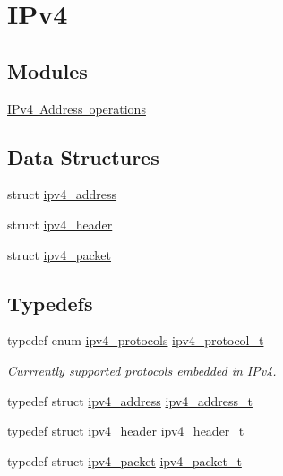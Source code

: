 \hypertarget{group__ipv4}{}\section{I\+Pv4}
\label{group__ipv4}
\subsection*{Modules}
\begin{DoxyCompactItemize}
\item 
\mbox{\hyperlink{group__ip__operations}{I\+Pv4 Address operations}}
\end{DoxyCompactItemize}
\subsection*{Data Structures}
\begin{DoxyCompactItemize}
\item 
struct \mbox{\hyperlink{structipv4__address}{ipv4\+\_\+address}}
\item 
struct \mbox{\hyperlink{structipv4__header}{ipv4\+\_\+header}}
\item 
struct \mbox{\hyperlink{structipv4__packet}{ipv4\+\_\+packet}}
\end{DoxyCompactItemize}
\subsection*{Typedefs}
\begin{DoxyCompactItemize}
\item 
typedef enum \mbox{\hyperlink{group__ipv4_gacbfe55abe1d01bf1da8b66868f8135aa}{ipv4\+\_\+protocols}} \mbox{\hyperlink{group__ipv4_gaf689af7304e282d1606e70bf56cbc3d4}{ipv4\+\_\+protocol\+\_\+t}}
\begin{DoxyCompactList}\small\item\em Currrently supported protocols embedded in I\+Pv4. \end{DoxyCompactList}\item 
typedef struct \mbox{\hyperlink{structipv4__address}{ipv4\+\_\+address}} \mbox{\hyperlink{group__ipv4_gad9df0882950e70d0587a4b423beb261a}{ipv4\+\_\+address\+\_\+t}}
\item 
typedef struct \mbox{\hyperlink{structipv4__header}{ipv4\+\_\+header}} \mbox{\hyperlink{group__ipv4_gaf4f2c6743b9fb1ea3c69734612ce41de}{ipv4\+\_\+header\+\_\+t}}
\item 
typedef struct \mbox{\hyperlink{structipv4__packet}{ipv4\+\_\+packet}} \mbox{\hyperlink{group__ipv4_ga68ea36d252d9332fd5e37d9aaedd06af}{ipv4\+\_\+packet\+\_\+t}}
\end{DoxyCompactItemize}
